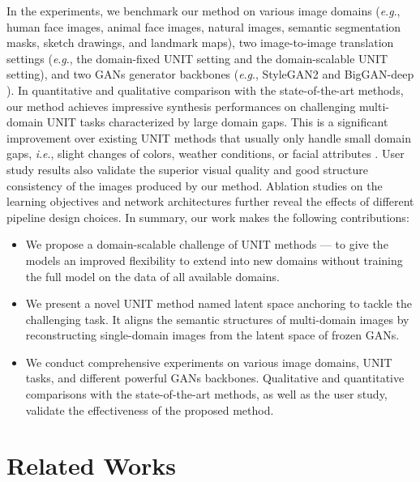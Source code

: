 \documentclass[10pt,journal,compsoc]{IEEEtran}
\newcommand{\ie}{\textit{i}.\textit{e}.}
\newcommand{\eg}{\textit{e}.\textit{g}.}
\begin{document}
In the experiments, we benchmark our method on various image domains (\eg, human face images, animal face images, natural images, semantic segmentation masks, sketch drawings, and landmark maps), two image-to-image translation settings (\eg, the domain-fixed UNIT setting and the domain-scalable UNIT setting), and two GANs generator backbones (\eg, StyleGAN2 \cite{stylegan2} and BigGAN-deep \cite{biggan}). 
In quantitative and qualitative comparison with the state-of-the-art methods, our method achieves impressive synthesis performances on challenging multi-domain UNIT tasks characterized by large domain gaps. This is a significant improvement over existing UNIT methods that usually only handle small domain gaps, \ie, slight changes of colors, weather conditions, or facial attributes \cite{cyclegan,stargan}. User study results also validate the superior visual quality and good structure consistency of the images produced by our method. Ablation studies on the learning objectives and network architectures further reveal the effects of different pipeline design choices. 
In summary, our work makes the following contributions: 
\begin{itemize}
    \item We propose a domain-scalable challenge of UNIT methods --- to give the models an improved flexibility to extend into new domains without training the full model on the data of all available domains.
    \item We present a novel UNIT method named latent space anchoring to tackle the  challenging task. It aligns the semantic structures of multi-domain images by  reconstructing single-domain images from the latent space of frozen GANs. 
    \item We conduct comprehensive experiments on various image domains, UNIT tasks, and different powerful GANs backbones. Qualitative and quantitative comparisons with the state-of-the-art methods, as well as the user study, validate the effectiveness of the proposed method.
\end{itemize}



\section{Related Works}
\end{document}
